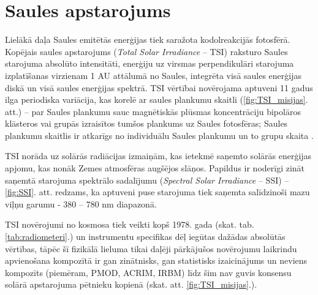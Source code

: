 \section{Saules apstarojums}

Lielākā daļa Saules emitētās enerģijas tiek saražota kodolreakcijās fotosfērā. 
Kopējais saules apstarojums (\textit{Total Solar Irradiance} -- TSI) raksturo Saules starojuma absolūto intensitāti, enerģiju uz virsmas perpendikulāri starojuma izplatīšanas virzienam 1 AU attālumā no Saules, integrēta visā saules enerģijas diskā un visā saules enerģijas spektrā. TSI vērtībai novērojama aptuveni 11 gadus ilga periodiska variācija, kas korelē ar saules plankumu skaitli (\ref{fig:TSI_misijas}. att.) -- par Saules plankumu sauc magnētiskās plūsmas koncentrāciju bipolāros klāsteros vai grupās izraisītos tumšos plankums uz Saules fotosfēras; Saules plankumu skaitlis ir atkarīgs no individuālu Saules plankumu un to grupu skaita \cite{ThermalProcesses}.

TSI norāda uz solārās radiācijas izmaiņām, kas ietekmē saņemto solārās enerģijas apjomu, kas nonāk Zemes atmosfēras augšējos slāņos. Papildus ir noderīgi zināt saņemtā starojuma spektrālo sadalījumu (\textit{Spectral Solar Irradiance} -- SSI) -- \ref{fig:SSI}. att. redzams, ka aptuveni puse starojuma tiek saņemta salīdzinoši mazu viļņu garumu - 380 -- 780 nm diapazonā.

TSI novērojumi no kosmosa tiek veikti kopš 1978. gada (skat. tab. \ref{tab:radiometeri}.) un instrumentu specifikas dēļ iegūtas dažādas absolūtās vērtības, tāpēc šī fizikālā lieluma tikai daļēji pārkājušos novērojumu laikrindu apvienošana kompozītā ir gan zinātnisks, gan statistisks izaicinājums un neviens kompozīts (piemēram, PMOD, ACRIM, IRBM) līdz šim nav guvis konsensu solārā apstarojuma pētnieku kopienā (skat. att. \ref{fig:TSI_misijas}.).

